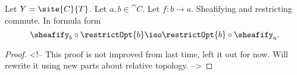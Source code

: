 \begin{lemma}
Let $Y = \site{C}{T}$.
Let $a,b \in \cat{C}$.
Let $f:b\rightarrow a$.
Sheafifying and restricting commute.
In formula form
\[\sheafify_b \circ \restrictOpt{b} \iso \restrictOpt{b} \circ \sheafify_a.\]
\end{lemma}

\begin{proof}
<!-- This proof is not improved from last time, left it out for now. Will rewrite it using new parts about relative topology. -->









\end{proof}